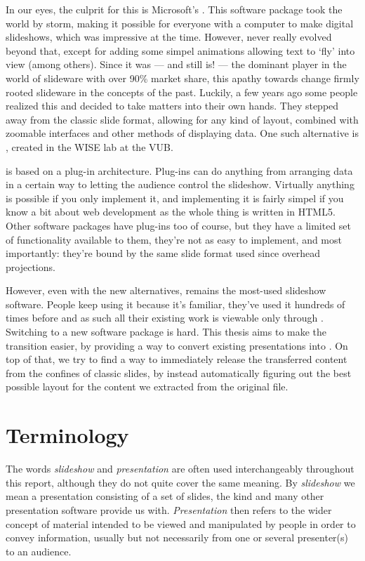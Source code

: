   In our eyes, the culprit for this is Microsoft's \ppt. This software package
  took the world by storm, making it possible for everyone with a computer to
  make digital slideshows, which was impressive at the time. However, \ppt*
  never really evolved beyond that, except for adding some simpel animations
  allowing text to `fly' into view (among others). Since it was --- and still
  is! --- the dominant player in the world of slideware with over 90\% market
  share, this apathy towards change firmly rooted slideware in the concepts of
  the past.  Luckily, a few years ago some people realized this and decided to
  take matters into their own hands. They stepped away from the classic slide
  format, allowing for any kind of layout, combined with zoomable interfaces
  and other methods of displaying data. One such alternative is \mxp, created
  in the WISE lab at the VUB.

  \mxp is based on a plug-in architecture. Plug-ins can do anything from
  arranging data in a certain way to letting the audience control the
  slideshow. Virtually anything is possible if you only implement it, and
  implementing it is fairly simpel if you know a bit about web development as
  the whole thing is written in HTML5. Other software packages have plug-ins
  too of course, but they have a limited set of functionality available to
  them, they're not as easy to implement, and most importantly: they're bound
  by the same slide format used since overhead projections.

  However, even with the new alternatives, \ppt* remains the most-used slideshow
  software. People keep using it because it's familiar, they've used it
  hundreds of times before and as such all their existing work is viewable only
  through \ppt. Switching to a new software package is hard. This thesis aims
  to make the transition easier, by providing a way to convert existing \ppt
  presentations into \mxp. On top of that, we try to find a way to immediately
  release the transferred content from the confines of classic slides, by
  instead automatically figuring out the best possible layout for the content
  we extracted from the original \ppt file.

  \section{Terminology}


   The words \emph{slideshow} and \emph{presentation} are often used
   interchangeably throughout this report, although they do not quite cover the
   same meaning. By \emph{slideshow} we mean a presentation consisting of a set
   of slides, the kind \ppt* and many other presentation software provide us
   with. \emph{Presentation} then refers to the wider concept of material
   intended to be viewed and manipulated by people in order to convey
   information, usually but not necessarily from one or several presenter(s) to
   an audience.

